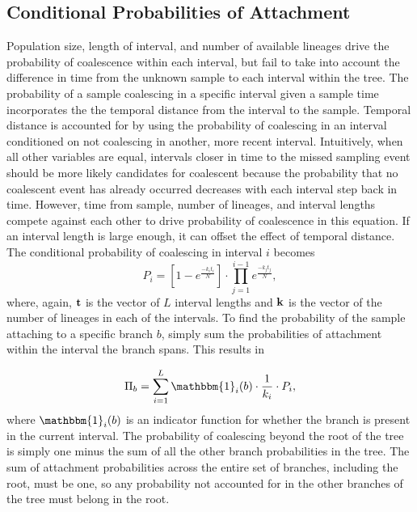 \documentclass[11pt,oneside,letterpaper]{article}
\newcommand\tab[1][1cm]{\hspace*{#1}}
\begin{document}
\subsection*{Conditional Probabilities of Attachment}
\tab Population size, length of interval, and number of available lineages drive the probability of coalescence within each interval, but fail to take into account the difference in time from the unknown sample to each interval within the tree. The probability of a sample coalescing in a specific interval given a sample time incorporates the the temporal distance from the interval to the sample. Temporal distance is accounted for by using the probability of coalescing in an interval conditioned on not coalescing in another, more recent interval. Intuitively, when all other variables are equal, intervals closer in time to the missed sampling event should be more likely candidates for coalescent because the probability that no coalescent event has already occurred decreases with each interval step back in time. However, time from sample, number of lineages, and interval lengths compete against each other to drive probability of coalescence in this equation. If an interval length is large enough, it can offset the effect of temporal distance. The conditional probability of coalescing in interval $i$ becomes
\begin{equation} \label{eq_2}
	P_i = [1-e^{\frac{-k_it_i}{N}}] \cdot \prod_{j=1}^{i-1} e^{\frac{-k_jt_j}{N}},
\end{equation}
where, again, $\bf{t}$ is the vector of $L$ interval lengths and $\bf{k}$ is the vector of the number of lineages in each of the intervals. To find the probability of the sample attaching to a specific branch $b$, simply sum the probabilities of attachment within the interval the branch spans. This results in

\begin{equation} \label{eq_3}
	\Pi_b = \sum_{i=1}^L \mathbbm{1}_i(b) \cdot \frac{1}{k_i}\cdot P_i,
\end{equation}
where $\mathbbm{1}_i(b)$ is an indicator function for whether the branch is present in the current interval. The probability of coalescing beyond the root of the tree is simply one minus the sum of all the other branch probabilities in the tree. The sum of attachment probabilities across the entire set of branches, including the root, must be one, so any probability not accounted for in the other branches of the tree must belong in the root. 
\end{document}
